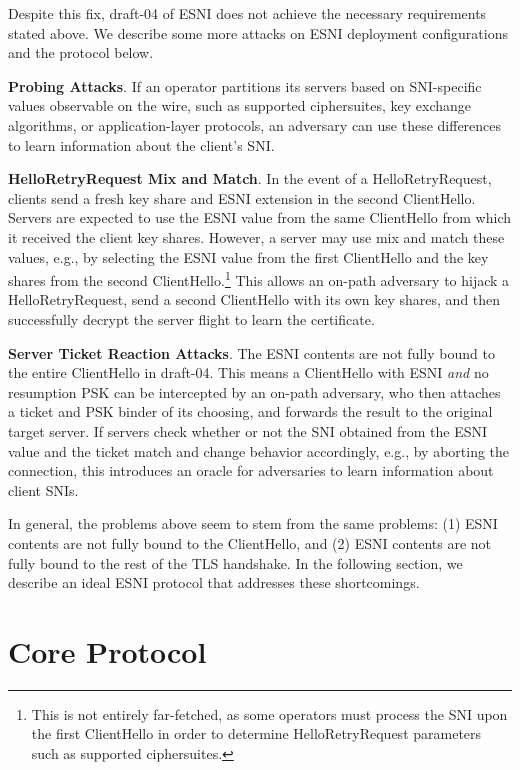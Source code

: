 \documentclass{article}
\theoremstyle{definition}
\theoremstyle{definition}
\begin{document}
Despite this fix, draft-04 of ESNI does not achieve the necessary requirements stated above. We
describe some more attacks on ESNI deployment configurations and the protocol below.

\textbf{Probing Attacks}. If an operator partitions its servers based on SNI-specific values observable
on the wire, such as supported ciphersuites, key exchange algorithms, or application-layer protocols,
an adversary can use these differences to learn information about the client's SNI.

\textbf{HelloRetryRequest Mix and Match}. In the event of a HelloRetryRequest, clients send a fresh
key share and ESNI extension in the second ClientHello. Servers are expected to use the ESNI value
from the same ClientHello from which it received the client key shares. However, a server may use
mix and match these values, e.g., by selecting the ESNI value from the first ClientHello and the key
shares from the second ClientHello.\footnote{This is not entirely far-fetched, as some operators must
process the SNI upon the first ClientHello in order to determine HelloRetryRequest parameters such
as supported ciphersuites.} This allows an on-path adversary to hijack a HelloRetryRequest, send a
second ClientHello with its own key shares, and then successfully decrypt the server flight to learn
the certificate.

\textbf{Server Ticket Reaction Attacks}. The ESNI contents are not fully bound to the entire 
ClientHello in draft-04. This means a ClientHello with ESNI \emph{and} no resumption PSK can be 
intercepted by an on-path adversary, who then attaches a ticket and PSK binder of its choosing,
and forwards the result to the original target server. If servers check whether or not the SNI
obtained from the ESNI value and the ticket match and change behavior accordingly, e.g.,
by aborting the connection, this introduces an oracle for adversaries to learn information about
client SNIs.

In general, the problems above seem to stem from the same problems: (1) ESNI contents are not
fully bound to the ClientHello, and (2) ESNI contents are not fully bound to the rest of the TLS
handshake. In the following section, we describe an ideal ESNI protocol that addresses these
shortcomings.

\section{Core Protocol} \label{sec:core} %
\end{document}
